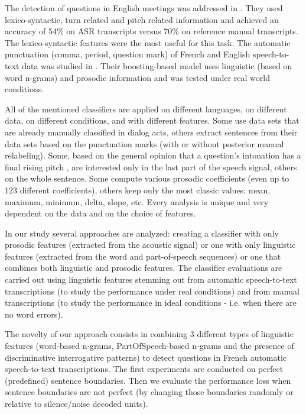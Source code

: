 \documentclass[conference]{IEEEtran}
\begin{document}
The detection of questions in English meetings was addressed in \cite{Boakye:2009}. They used lexico-syntactic, turn related and pitch related information and achieved an accuracy of 54\% on ASR transcripts versus 70\% on reference manual transcripts. The lexico-syntactic features were the most useful for this task.
The automatic punctuation (comma, period, question mark) of French and English speech-to-text data was studied in \cite{Kolar:2012}. Their boosting-based model uses linguistic (based on word n-grams) and prosodic information and was tested under real world conditions. 

All of the mentioned classifiers are applied on different languages, on different data, on different conditions, and with different features. Some use data sets that are already manually classified in dialog acts, others extract sentences from their data sets based on the punctuation marks (with or without posterior manual relabeling). Some, based on the general opinion that a question's intonation has a final rising pitch \cite{Cristo:1998}, are interested only in the last part of the speech signal, others on the whole sentence. Some compute various prosodic coefficients (even up to 123 different coefficients), others keep only the most classic values: mean, maximum, minimum, delta, slope, etc. Every analysis is unique and very dependent on the data and on the choice of features. 

In our study several approaches are analyzed: creating a classifier with only prosodic features (extracted from the acoustic signal) or one with only linguistic features (extracted from the word and part-of-speech sequences) or one that combines both linguistic and prosodic features. The classifier evaluations are carried out using linguistic features stemming out from automatic speech-to-text transcriptions (to study the performance under real conditions) and from manual transcriptions (to study the performance in ideal conditions - i.e. when there are no word errors). 

The novelty of our approach consists in combining 3 different types of linguistic features (word-based n-grams, PartOfSpeech-based n-grams and the presence of discriminative interrogative patterns) to detect questions in French automatic speech-to-text transcriptions. The first experiments are conducted on perfect (predefined) sentence boundaries. 
Then we evaluate the performance loss when sentence boundaries are not perfect (by changing those boundaries randomly or relative to silence/noise decoded units).
\end{document}
